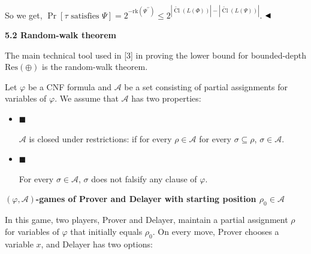So we get, $\Pr[\tau\mbox{ satisfies }\Psi]=2^{-\mathrm{rk}(\Psi^{\prime\prime})}\leq 2^{|\widetilde{\mathop{\mathrm{Cl}}}(L(\Phi))|-|\widetilde{\mathop{\mathrm{Cl}}}(L(\Psi))|}$.
$\hfill\blacktriangleleft$\par


\par\medskip\noindent\textbf{
5.2 Random-walk theorem}\par


The main technical tool used in [3] in proving the lower bound for bounded-depth $\mathrm{Res}(\oplus)$ is the random-walk theorem.\par



Let $\varphi$ be a CNF formula and $\mathcal{A}$ be a set consisting of partial assignments for variables of $\varphi$. We assume that $\mathcal{A}$ has two properties:\par


\begin{itemize}


\item 
$\blacksquare$ 


$\mathcal{A}$ is closed under restrictions: if for every $\rho\in\mathcal{A}$ for every $\sigma\subseteq\rho$, $\sigma\in\mathcal{A}$.\par





\item 
$\blacksquare$ 


For every $\sigma\in\mathcal{A}$, $\sigma$ does not falsify any clause of $\varphi$.\par





\end{itemize}


\par\medskip\noindent\textbf{
$(\varphi,\mathcal{A})$-games of Prover and Delayer with starting position $\rho_{0}\in\mathcal{A}$
}\par


In this game, two players, Prover and Delayer, maintain a partial assignment $\rho$ for variables of $\varphi$ that initially equals $\rho_{0}$.
On every move, Prover chooses a variable $x$, and Delayer has two options:\par


